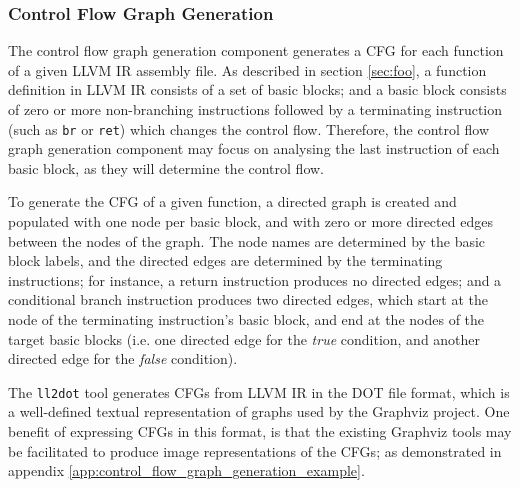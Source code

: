 
\subsubsection{Control Flow Graph Generation}
\label{sec:design_control_flow_graph_generation}

The control flow graph generation component generates a CFG for each function of a given LLVM IR assembly file. As described in section \ref{sec:foo}, a function definition in LLVM IR consists of a set of basic blocks; and a basic block consists of zero or more non-branching instructions followed by a terminating instruction (such as \texttt{br} or \texttt{ret}) which changes the control flow. Therefore, the control flow graph generation component may focus on analysing the last instruction of each basic block, as they will determine the control flow.

To generate the CFG of a given function, a directed graph is created and populated with one node per basic block, and with zero or more directed edges between the nodes of the graph. The node names are determined by the basic block labels, and the directed edges are determined by the terminating instructions; for instance, a return instruction produces no directed edges; and a conditional branch instruction produces two directed edges, which start at the node of the terminating instruction's basic block, and end at the nodes of the target basic blocks (i.e. one directed edge for the \textit{true} condition, and another directed edge for the \textit{false} condition).

The \texttt{ll2dot} tool generates CFGs from LLVM IR in the DOT file format, which is a well-defined textual representation of graphs used by the Graphviz project. One benefit of expressing CFGs in this format, is that the existing Graphviz tools may be facilitated to produce image representations of the CFGs; as demonstrated in appendix \ref{app:control_flow_graph_generation_example}.

